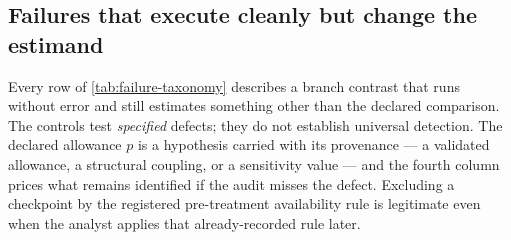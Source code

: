 \subsection{Failures that execute cleanly but change the estimand}
\label{app:failure-taxonomy}

Every row of \cref{tab:failure-taxonomy} describes a branch contrast that runs
without error and still estimates something other than the declared comparison.
The controls test \emph{specified} defects; they do not establish universal
detection.  The declared allowance $p$ is a hypothesis carried with its
provenance --- a validated allowance, a structural coupling, or a sensitivity
value --- and the fourth column prices what remains identified if the audit
misses the defect.  Excluding a checkpoint by the registered pre-treatment availability
rule is legitimate even when the analyst applies that already-recorded rule later.

